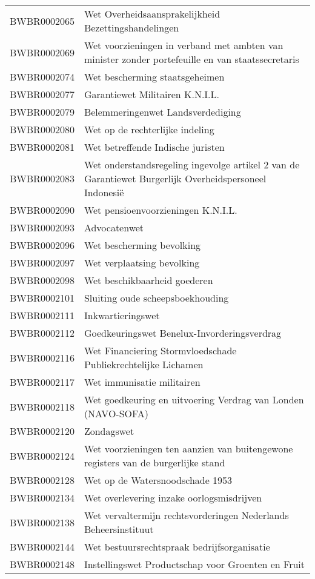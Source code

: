 \begin{longtable}{lp{}}
BWBR0002065 & Wet Overheidsaansprakelijkheid Bezettingshandelingen \\
BWBR0002069 & Wet voorzieningen in verband met ambten van minister zonder portefeuille en van staatssecretaris \\
BWBR0002074 & Wet bescherming staatsgeheimen \\
BWBR0002077 & Garantiewet Militairen K.N.I.L. \\
BWBR0002079 & Belemmeringenwet Landsverdediging \\
BWBR0002080 & Wet op de rechterlijke indeling \\
BWBR0002081 & Wet betreffende Indische juristen \\
BWBR0002083 & Wet onderstandsregeling ingevolge artikel 2 van de Garantiewet Burgerlijk Overheidspersoneel Indonesië \\
BWBR0002090 & Wet pensioenvoorzieningen K.N.I.L.  \\
BWBR0002093 & Advocatenwet \\
BWBR0002096 & Wet bescherming bevolking \\
BWBR0002097 & Wet verplaatsing bevolking  \\
BWBR0002098 & Wet beschikbaarheid goederen  \\
BWBR0002101 & Sluiting oude scheepsboekhouding \\
BWBR0002111 & Inkwartieringswet \\
BWBR0002112 & Goedkeuringswet Benelux-Invorderingsverdrag \\
BWBR0002116 & Wet Financiering Stormvloedschade Publiekrechtelijke Lichamen \\
BWBR0002117 & Wet immunisatie militairen \\
BWBR0002118 & Wet goedkeuring en uitvoering Verdrag van Londen (NAVO-SOFA) \\
BWBR0002120 & Zondagswet \\
BWBR0002124 & Wet voorzieningen ten aanzien van buitengewone registers van de burgerlijke stand \\
BWBR0002128 & Wet op de Watersnoodschade 1953 \\
BWBR0002134 & Wet overlevering inzake oorlogsmisdrijven \\
BWBR0002138 & Wet vervaltermijn rechtsvorderingen Nederlands Beheersinstituut \\
BWBR0002144 & Wet bestuursrechtspraak bedrijfsorganisatie \\
BWBR0002148 & Instellingswet Productschap voor Groenten en Fruit \\

\end{longtable}
